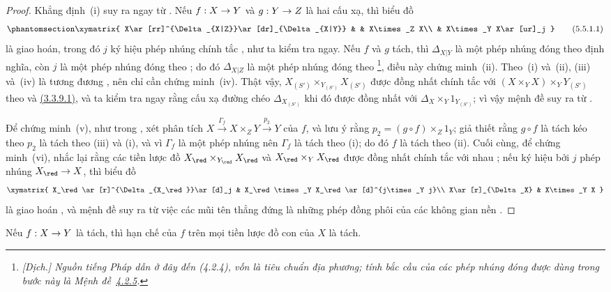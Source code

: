 \documentclass[oneside]{amsart}
\makeatletter
\newcommand{\ega@arrow}[2]{\mathchoice{#1}{#2}{#2}{#2}}
\renewcommand{\to}{\ega@arrow{\longrightarrow}{\rightarrow}}
\newcommand{\oldpage}[2][]{{\marginnote{\normalfont\textbf{#1}~|~#2}}\ignorespaces}
\let\EGAOriginalLabel\label
\renewcommand{\label}[1]{\phantomsection\EGAOriginalLabel{#1}}
\makeatother
\begin{document}
\begin{proof}
Khẳng định~(i) suy ra ngay từ .
Nếu $f:X\to Y$ và $g:Y\to Z$ là hai cấu xạ, thì biểu đồ
\[
\label{I.5.5.1.1}
  \xymatrix{
    X\ar[rr]^{\Delta_{X|Z}}\ar[dr]_{\Delta_{X|Y}} & &
    X\times_Z X\\
    & X\times_Y X\ar[ur]_j
  }
  \tag{5.5.1.1}
\]
là giao hoán, trong đó $j$ ký hiệu phép nhúng chính tắc , như
ta kiểm tra ngay.
Nếu $f$ và $g$ tách, thì $\Delta_{X|Y}$ là một phép nhúng đóng theo định
nghĩa, còn $j$ là một phép nhúng đóng theo ; do đó
$\Delta_{X|Z}$ là một phép nhúng đóng theo \footnote{\emph{[Dịch.]
Nguồn tiếng Pháp dẫn ở đây đến (4.2.4), vốn là tiêu chuẩn địa phương; tính bắc
cầu của các phép nhúng đóng được dùng trong bước này là Mệnh đề~\hyperref[I.4.2.5]{4.2.5}.}}, điều này
\oldpage[I]{137}
chứng minh~(ii).
Theo~(i) và~(ii), (iii) và~(iv) là tương đương , nên chỉ cần
chứng minh~(iv).
Thật vậy, $X_{(S')}\times_{Y_{(S')}}X_{(S')}$ được đồng nhất chính tắc với
$(X\times_Y X)\times_Y Y_{(S')}$ theo  và
\hyperref[I.3.3.9.1]{(3.3.9.1)}, và ta kiểm tra ngay rằng cấu xạ đường chéo
$\Delta_{X_{(S')}}$ khi đó được đồng nhất với
$\Delta_X\times_Y 1_{Y_{(S')}}$; vì vậy mệnh đề suy ra từ .

Để chứng minh~(v), như trong , xét phân tích
$X\xrightarrow{\Gamma_f}X\times_Z Y\xrightarrow{p_2}Y$ của $f$, và lưu ý
rằng $p_2=(g\circ f)\times_Z 1_Y$; giả thiết rằng $g\circ f$ là tách kéo theo
$p_2$ là tách theo (iii) và (i), và vì $\Gamma_f$ là một phép nhúng nên
$\Gamma_f$ là tách theo (i); do đó $f$ là tách theo (ii).
Cuối cùng, để chứng minh~(vi), nhắc lại rằng các tiền lược đồ
$X_\red\times_{Y_\red}X_\red$ và $X_\red\times_Y X_\red$ được đồng nhất
chính tắc với nhau ; nếu ký hiệu bởi $j$ phép nhúng
$X_\red\to X$, thì biểu đồ
\[
  \xymatrix{
    X_\red\ar[r]^{\Delta_{X_\red}}\ar[d]_j &
    X_\red\times_Y X_\red\ar[d]^{j\times_Y j}\\
    X\ar[r]_{\Delta_X} & X\times_Y X
  }
\]
là giao hoán , và mệnh đề suy ra từ việc các mũi tên thẳng
đứng là những phép đồng phôi của các không gian nền .
\end{proof}

\begin{corollary}[5.5.2]
\label{I.5.5.2}
Nếu $f:X\to Y$ là tách, thì hạn chế của $f$ trên mọi tiền lược đồ con của
$X$ là tách.
\end{corollary}
\end{document}
